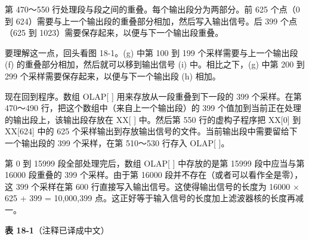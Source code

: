 第 470～550 行处理段与段之间的重叠。每个输出段分为两部分。前 625 个点（0
到 624）需要与上一个输出段的重叠部分相加，然后写入输出信号。后 399
个点（625 到 1023）需要保存起来，以便与下一个输出段重叠。

要理解这一点，回头看图 18-1。(g) 中第 100 到 199
个采样需要与上一个输出段 (f) 的重叠部分相加，然后就可以移到输出信号 (i)
中。相比之下，(g) 中第 200 到 299 个采样需要保存起来，以便与下一个输出段
(h) 相加。

现在回到程序。数组 OLAP{[} {]} 用来存放从一段重叠到下一段的 399
个采样。在第 470～490 行，把这个数组中（来自上一个输出段）的 399
个值加到当前正在处理的输出段上，该输出段存放在 XX{[} {]} 中。然后第 550
行的虚构子程序把 XX{[}0{]} 到 XX{[}624{]} 中的 625
个采样输出到存放输出信号的文件。当前输出段中需要留给下一个输出段的 399
个采样，在第 510～530 行存入 OLAP{[} {]}。

第 0 到 15999 段全部处理完后，数组 OLAP{[} {]} 中存放的是第 15999
段中应当与第 16000 段重叠的 399 个采样。由于第 16000
段并不存在（或者可以看作全是零），这 399 个采样在第 600
行直接写入输出信号。这使得输出信号的长度为 16000 × 625 + 399 =
10,000,399 点。这正好等于输入信号的长度加上滤波器核的长度再减一。

\textbf{表 18-1}（注释已译成中文）

